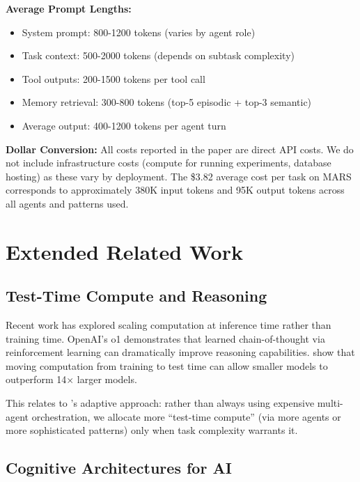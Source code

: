 \documentclass{article}
\theoremstyle{plain}
\theoremstyle{definition}
\theoremstyle{remark}
\begin{document}
\textbf{Average Prompt Lengths:}
\begin{itemize}[nosep]
	\item System prompt: 800-1200 tokens (varies by agent role)
	\item Task context: 500-2000 tokens (depends on subtask complexity)
	\item Tool outputs: 200-1500 tokens per tool call
	\item Memory retrieval: 300-800 tokens (top-5 episodic + top-3 semantic)
	\item Average output: 400-1200 tokens per agent turn
\end{itemize}

\textbf{Dollar Conversion:} All costs reported in the paper are direct API costs. We do not include infrastructure costs (compute for running experiments, database hosting) as these vary by deployment. The \$3.82 average cost per task on MARS corresponds to approximately 380K input tokens and 95K output tokens across all agents and patterns used.

\section{Extended Related Work}
\label{app:related}

\subsection{Test-Time Compute and Reasoning}

Recent work has explored scaling computation at inference time rather than training time. OpenAI's o1 \citep{openai2024o1} demonstrates that learned chain-of-thought via reinforcement learning can dramatically improve reasoning capabilities. \citet{snell2024scaling} show that moving computation from training to test time can allow smaller models to outperform 14$\times$ larger models.

This relates to \amore{}'s adaptive approach: rather than always using expensive multi-agent orchestration, we allocate more ``test-time compute'' (via more agents or more sophisticated patterns) only when task complexity warrants it.

\subsection{Cognitive Architectures for AI}
\end{document}
